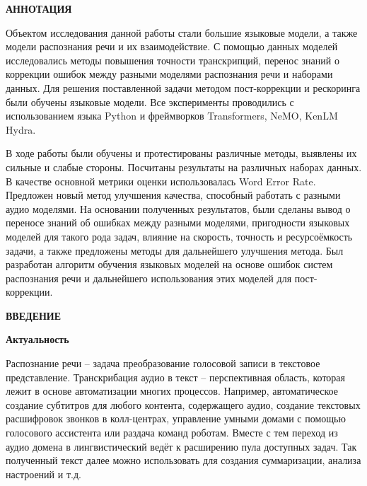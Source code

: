 \newpage
\begin{center}
  \textbf{\large АННОТАЦИЯ}
\end{center}


Объектом исследования данной работы стали большие языковые модели, а также модели распознания речи и их взаимодействие.
С помощью данных моделей исследовались методы повышения точности транскрипций, перенос знаний о коррекции ошибок между разными моделями распознания речи и наборами данных.
Для решения поставленной задачи методом пост-коррекции и рескоринга были обучены языковые модели.
Все эксперименты проводились с использованием языка Python и фреймворков Transformers, NeMO, KenLM Hydra.

В ходе работы были обучены и протестированы различные методы, выявлены их сильные и слабые стороны.
Посчитаны результаты на различных наборах данных.
В качестве основной метрики оценки использовалась Word Error Rate.
Предложен новый метод улучшения качества, способный работать с разными аудио моделями.
На основании полученных результатов, были сделаны вывод о переносе знаний об ошибках между разными моделями, пригодности языковых моделей для такого рода задач, влияние на скорость, точность и ресурсоёмкость задачи, а также предложены методы для дальнейшего улучшения метода.
Был разработан алгоритм обучения языковых моделей на основе ошибок систем распознания речи и дальнейшего использования этих моделей для пост-коррекции.

\onehalfspacing
\setcounter{page}{2}

\newpage
\renewcommand{\contentsname}{\centerline{\large СОДЕРЖАНИЕ}}
\tableofcontents

\newpage
\begin{center}
  \textbf{\large ВВЕДЕНИЕ}
\end{center}


\textbf{Актуальность}

Распознание речи – задача преобразование голосовой записи в текстовое представление.
Транскрибация аудио в текст – перспективная область, которая лежит в основе автоматизации многих процессов.
Например, автоматическое создание субтитров для любого контента, содержащего аудио, создание текстовых расшифровок звонков в колл-центрах, управление умными домами с помощью голосового ассистента или раздача команд роботам.
Вместе с тем переход из аудио домена в лингвистический ведёт к расширению пула доступных задач.
Так полученный текст далее можно использовать для создания суммаризации, анализа настроений и т.д.

